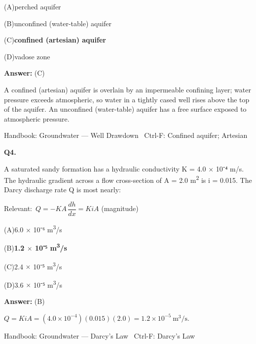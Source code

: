 \documentclass[11pt]{article}
\newcommand{\correct}[1]{\textbf{#1}\;{\color{accent}$\checkmark$}}
\newcommand{\optline}[2]{\par\noindent\hspace{1.2em}(#1)\hspace{0.6em}#2}
\begin{document}
\optline{A}{perched aquifer}
\optline{B}{unconfined (water-table) aquifer}
\optline{C}{\correct{confined (artesian) aquifer}}
\optline{D}{vadose zone}
\par\vspace{3pt}
\vspace{2pt}\par\noindent\colorbox{boxbg}{\parbox{\dimexpr\linewidth-2\fboxsep\relax}{%
\vspace{2pt}\textbf{Answer:} (C)\par\vspace{2pt}
{\small A confined (artesian) aquifer is overlain by an impermeable confining layer; water pressure exceeds atmospheric, so water in a tightly cased well rises above the top of the aquifer. An unconfined (water-table) aquifer has a free surface exposed to atmospheric pressure.}\par\vspace{2pt}
{\footnotesize\color{soft}Handbook: Groundwater --- Well Drawdown \textbullet\ Ctrl-F: Confined aquifer; Artesian}\vspace{2pt}
}}
\vspace{9pt}
\filbreak
\textbf{\color{accent}Q4.}\par\vspace{2pt}
A saturated sandy formation has a hydraulic conductivity K = 4.0 $\times$ 10⁻⁴ m/s. The hydraulic gradient across a flow cross-section of A = 2.0 m\textsuperscript{2} is i = 0.015. The Darcy discharge rate Q is most nearly:\par\vspace{3pt}
{\small\color{soft}Relevant:}\ $Q = -KA\,\dfrac{dh}{dx} = KiA$ (magnitude)\par\vspace{3pt}
\optline{A}{6.0 $\times$ 10⁻⁶ m\textsuperscript{3}/s}
\optline{B}{\correct{1.2 $\times$ 10⁻⁵ m\textsuperscript{3}/s}}
\optline{C}{2.4 $\times$ 10⁻⁵ m\textsuperscript{3}/s}
\optline{D}{3.6 $\times$ 10⁻⁵ m\textsuperscript{3}/s}
\par\vspace{3pt}
\vspace{2pt}\par\noindent\colorbox{boxbg}{\parbox{\dimexpr\linewidth-2\fboxsep\relax}{%
\vspace{2pt}\textbf{Answer:} (B)\par\vspace{2pt}
{\small $Q = KiA = (4.0\times10^{-4})(0.015)(2.0) = 1.2\times10^{-5}\ \mathrm{m^3/s}$.}\par\vspace{2pt}
{\footnotesize\color{soft}Handbook: Groundwater --- Darcy's Law \textbullet\ Ctrl-F: Darcy's Law}\vspace{2pt}
}}
\end{document}
